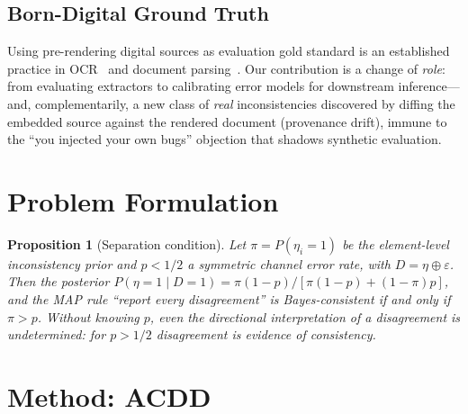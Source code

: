 \documentclass[10pt,twocolumn]{article}
\newtheorem{proposition}{Proposition}
\newcommand{\eps}{\ensuremath{\varepsilon}}
\begin{document}
\subsection{Born-Digital Ground Truth}
Using pre-rendering digital sources as evaluation gold standard is an
established practice in OCR~\cite{karatzas2011icdar,jaderberg2014synthetic}
and document parsing~\cite{li2024chemscraper}.  Our contribution is a
change of \emph{role}: from evaluating extractors to calibrating error
models for downstream inference---and, complementarily, a new class
of \emph{real} inconsistencies discovered by diffing the embedded
source against the rendered document (provenance drift), immune to
the ``you injected your own bugs'' objection that shadows synthetic
evaluation.

\section{Problem Formulation}
\label{sec:formulation}


\begin{proposition}[Separation condition]
\label{prop:separation}
Let $\pi = P(\eta_i = 1)$ be the element-level inconsistency prior
and $p < 1/2$ a symmetric channel error rate, with
$D = \eta \oplus \eps$.  Then the posterior
$P(\eta{=}1 \mid D{=}1) = \pi(1-p) / [\pi(1-p) + (1-\pi)p]$,
and the MAP rule ``report every disagreement'' is Bayes-consistent
\emph{if and only if} $\pi > p$.  Without knowing $p$, even the
\emph{directional interpretation} of a disagreement is
undetermined: for $p > 1/2$ disagreement is evidence of
\emph{consistency}.
\end{proposition}


\section{Method: ACDD}
\label{sec:method}
\end{document}

